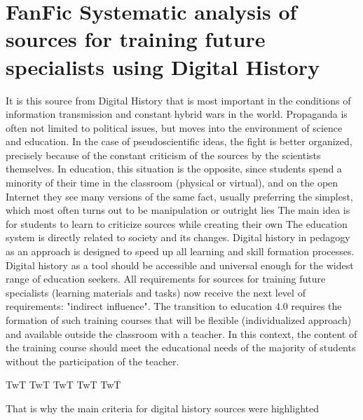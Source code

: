 \section{FanFic Systematic analysis of sources for training future specialists using Digital History}
It is this source from Digital History that is most important in the conditions of information transmission and constant hybrid wars in the world. Propaganda is often not limited to political issues, but moves into the environment of science and education. In the case of pseudoscientific ideas, the fight is better organized, precisely because of the constant criticism of the sources by the scientists themselves.
In education, this situation is the opposite, since students spend a minority of their time in the classroom (physical or virtual), and on the open Internet they see many versions of the same fact, usually preferring the simplest, which most often turns out to be manipulation or outright lies
The main idea is for students to learn to criticize sources while creating their own
The education system is directly related to society and its changes. Digital history in pedagogy as an approach is designed to speed up all learning and skill formation processes. Digital history as a tool should be accessible and universal enough for the widest range of education seekers.
All requirements for sources for training future specialists (learning materials and tasks) now receive the next level of requirements: "indirect influence". The transition to education 4.0 \cite{MON} requires the formation of such training courses that will be flexible (individualized approach) and available outside the classroom with a teacher.
In this context, the content of the training course should meet the educational needs of the majority of students without the participation of the teacher.

TwT TwT TwT TwT TwT

That is why the main criteria for digital history sources were highlighted

